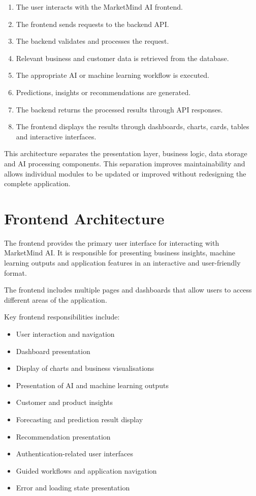 \documentclass[12pt,a4paper]{report}
\begin{document}
\begin{enumerate}[leftmargin=1.2cm]
    \item The user interacts with the MarketMind AI frontend.
    \item The frontend sends requests to the backend API.
    \item The backend validates and processes the request.
    \item Relevant business and customer data is retrieved from the database.
    \item The appropriate AI or machine learning workflow is executed.
    \item Predictions, insights or recommendations are generated.
    \item The backend returns the processed results through API responses.
    \item The frontend displays the results through dashboards, charts,
    cards, tables and interactive interfaces.
\end{enumerate}

This architecture separates the presentation layer, business logic,
data storage and AI processing components. This separation improves
maintainability and allows individual modules to be updated or improved
without redesigning the complete application.



\section{Frontend Architecture}

The frontend provides the primary user interface for interacting with
MarketMind AI. It is responsible for presenting business insights,
machine learning outputs and application features in an interactive and
user-friendly format.

The frontend includes multiple pages and dashboards that allow users to
access different areas of the application.

Key frontend responsibilities include:

\begin{itemize}[leftmargin=1.2cm]
    \item User interaction and navigation
    \item Dashboard presentation
    \item Display of charts and business visualisations
    \item Presentation of AI and machine learning outputs
    \item Customer and product insights
    \item Forecasting and prediction result display
    \item Recommendation presentation
    \item Authentication-related user interfaces
    \item Guided workflows and application navigation
    \item Error and loading state presentation
\end{itemize}
\end{document}
